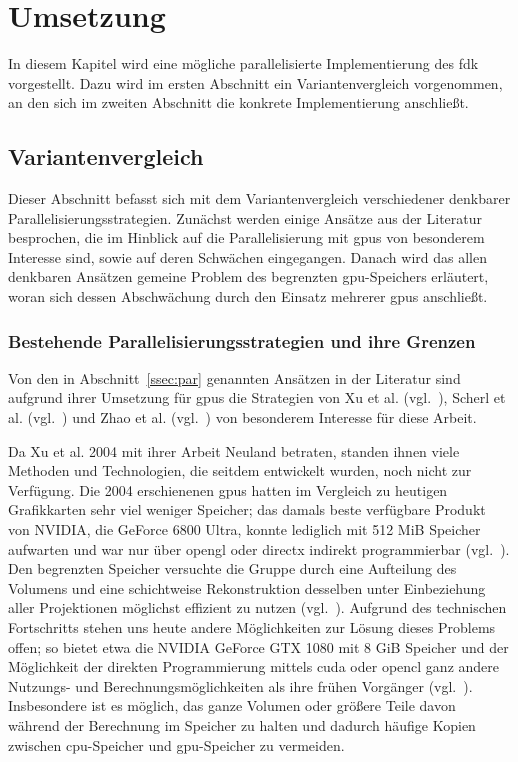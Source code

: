 \chapter{Umsetzung}\label{chap:umsetzung}

In diesem Kapitel wird eine mögliche parallelisierte Implementierung des \gls{fdk} vorgestellt. Dazu wird im ersten
Abschnitt ein Variantenvergleich vorgenommen, an den sich im zweiten Abschnitt die konkrete Implementierung anschließt.

\section{Variantenvergleich}

Dieser Abschnitt befasst sich mit dem Variantenvergleich verschiedener denkbarer Parallelisierungsstrategien. Zunächst
werden einige Ansätze aus der Literatur besprochen, die im Hinblick auf die Parallelisierung mit \gls{gpu}s von
besonderem Interesse sind, sowie auf deren Schwächen eingegangen. Danach wird das allen denkbaren Ansätzen
gemeine Problem des begrenzten \gls{gpu}-Speichers erläutert, woran sich dessen Abschwächung durch den Einsatz mehrerer
\gls{gpu}s anschließt.

\subsection{Bestehende Parallelisierungsstrategien und ihre Grenzen}\label{ssec:par_strat}

Von den in Abschnitt~\ref{ssec:par} genannten Ansätzen in der Literatur sind aufgrund ihrer Umsetzung für \gls{gpu}s die
Strategien von Xu et al. (vgl.~\cite{xumuell}), Scherl et al. (vgl.~\cite{scherlkeck}) und Zhao et al.
(vgl.~\cite{zhao}) von besonderem Interesse für diese Arbeit.

Da Xu et al. 2004 mit ihrer Arbeit Neuland betraten, standen ihnen viele Methoden und Technologien, die seitdem 
entwickelt wurden, noch nicht zur Verfügung. Die 2004 erschienenen \gls{gpu}s hatten im Vergleich zu heutigen
Grafikkarten sehr viel weniger Speicher; das damals beste verfügbare Produkt von NVIDIA{\textregistered}, die
GeForce{\textregistered} 6800 Ultra, konnte lediglich mit 512 MiB Speicher aufwarten und war nur über \gls{opengl} oder
\gls{directx} indirekt programmierbar (vgl.~\cite{geforce6800}). Den begrenzten Speicher versuchte die Gruppe durch eine
Aufteilung des Volumens und eine schichtweise Rekonstruktion desselben unter Einbeziehung aller Projektionen möglichst
effizient zu nutzen (vgl.~\cite{xumuell}). Aufgrund des technischen Fortschritts stehen uns heute andere Möglichkeiten
zur Lösung dieses Problems offen; so bietet etwa die NVIDIA{\textregistered} GeForce{\textregistered} GTX 1080 mit 8 GiB
Speicher und der Möglichkeit der direkten Programmierung mittels \gls{cuda} oder \gls{opencl} ganz andere Nutzungs- und
Berechnungsmöglichkeiten als ihre frühen Vorgänger (vgl.~\cite{gtx1080}). Insbesondere ist es möglich, das ganze Volumen
oder größere Teile davon während der Berechnung im Speicher zu halten und dadurch häufige Kopien zwischen
\gls{cpu}-Speicher und \gls{gpu}-Speicher zu vermeiden.


